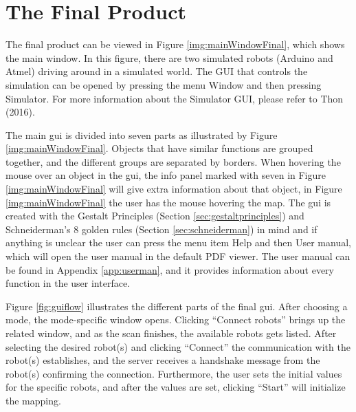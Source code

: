 \section{The Final Product}
The final product can be viewed in Figure \ref{img:mainWindowFinal}, which shows the main window. In this figure, there are two simulated robots (Arduino and Atmel) driving around in a simulated world. The GUI that controls the simulation can be opened by pressing the menu Window and then pressing Simulator. For more information about the Simulator GUI, please refer to Thon (2016).


The main \acrshort{gui} is divided into seven parts as illustrated by Figure \ref{img:mainWindowFinal}. Objects that have similar functions are grouped together, and the different groups are separated by borders. When hovering the mouse over an object in the \acrshort{gui}, the info panel marked with seven in Figure \ref{img:mainWindowFinal} will give extra information about that object, in Figure \ref{img:mainWindowFinal} the user has the mouse hovering the map. The \acrshort{gui} is created with the Gestalt Principles (Section \ref{sec:gestaltprinciples}) and Schneiderman's 8 golden rules (Section \ref{sec:schneiderman}) in mind and if anything is unclear the user can press the menu item Help and then User manual, which will open the user manual in the default PDF viewer. The user manual can be found in Appendix \ref{app:userman}, and it provides information about every function in the user interface.

Figure \ref{fig:guiflow} illustrates the different parts of the final \acrshort{gui}. After choosing a mode, the mode-specific window opens. Clicking ``Connect robots'' brings up the related window, and as the scan finishes, the available robots gets listed. After selecting the desired robot(s) and clicking ``Connect'' the communication with the robot(s) establishes, and the server receives a handshake message from the robot(s) confirming the connection. Furthermore, the user sets the initial values for the specific robots, and after the values are set, clicking ``Start'' will initialize the mapping.

